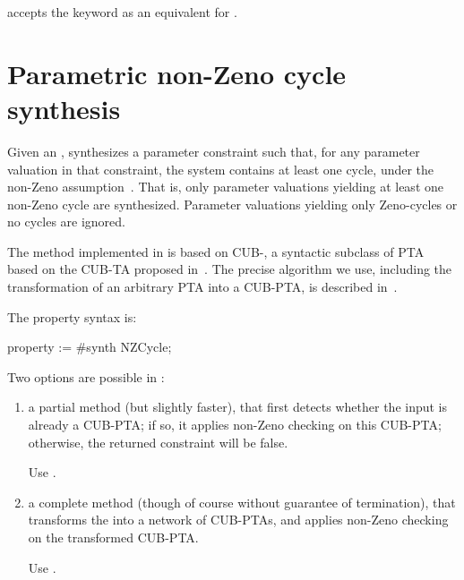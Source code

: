 \begin{syntaxalias}
	\imitator{} accepts the  keyword as an equivalent for .
\end{syntaxalias}



\section{Parametric non-Zeno cycle synthesis}\label{ss:mode:Zeno}

Given an \NIPTA{}, \imitator{} synthesizes a parameter constraint such that, for any parameter valuation in that constraint, the system contains at least one cycle, under the non-Zeno assumption~\cite{ANPS17}.
That is, only parameter valuations yielding at least one non-Zeno cycle are synthesized.
Parameter valuations yielding only Zeno-cycles or no cycles are ignored.

The method implemented in \imitator{} is based on CUB-\IPTA{}, a syntactic subclass of PTA based on the CUB-TA proposed in~\cite{WSWLSDYL15}.
The precise algorithm we use, including the transformation of an arbitrary PTA into a CUB-PTA, is described in~\cite{ANPS17}.

The property syntax is:

\begin{IMITATORproperty}
property := #synth NZCycle;
\end{IMITATORproperty}

Two options are possible in \imitator{}:
\begin{enumerate}
	\item a partial method (but slightly faster), that first detects whether the input \NIPTA{} is already a CUB-PTA; if so, it applies non-Zeno checking on this CUB-PTA; otherwise, the returned constraint will be false.

	      Use .

	\item a complete method (though of course without guarantee of termination), that transforms the \NIPTA{} into a network of CUB-PTAs, and applies non-Zeno checking on the transformed CUB-PTA.

	      Use .

\end{enumerate}

